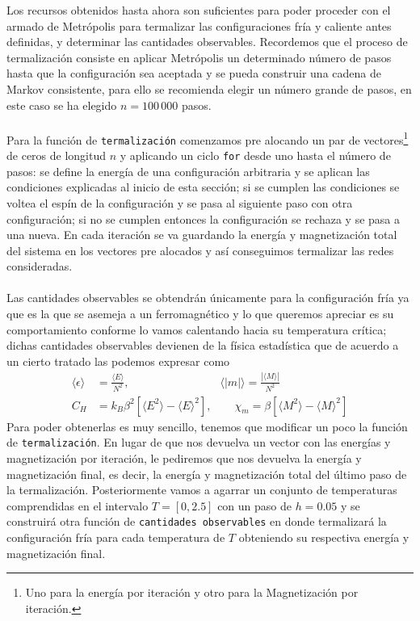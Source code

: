 \documentclass[11pt,a4paper]{article}
\begin{document}
Los recursos obtenidos hasta ahora son suficientes para poder proceder con el armado de Metrópolis para termalizar las configuraciones fría y caliente antes definidas, y determinar las cantidades observables. Recordemos que el proceso de termalización consiste en aplicar Metrópolis un determinado número de pasos hasta que la configuración sea aceptada y se pueda construir una cadena de Markov consistente, para ello se recomienda elegir un número grande de pasos, en este caso se ha elegido $n=100\, 000$ pasos.\\
\\
Para la función de \texttt{termalización} comenzamos pre alocando un par de vectores\footnote{Uno para la energía por iteración y otro para la Magnetización por iteración.} de ceros de longitud $n$ y aplicando un ciclo \texttt{for} desde uno hasta el número de pasos: se define la energía de una configuración arbitraria y se aplican las condiciones explicadas al inicio de esta sección; si se cumplen las condiciones se voltea el espín de la configuración y se pasa al siguiente paso con otra configuración; si no se cumplen entonces la configuración se rechaza y se pasa a una nueva. En cada iteración se va guardando la energía y magnetización total del sistema en los vectores pre alocados y así conseguimos termalizar las redes consideradas.\\
\\
Las cantidades observables se obtendrán únicamente para la configuración fría ya que es la que se asemeja a un ferromagnético y lo que queremos apreciar es su comportamiento conforme lo vamos calentando hacia su temperatura crítica; dichas cantidades observables devienen de la física estadística que de acuerdo a un cierto \cite{stickler} tratado las podemos expresar como
\begin{align}
\langle\epsilon\rangle&=\frac{\langle E\rangle}{N^2},\qquad\qquad\qquad\qquad \langle|m|\rangle=\frac{|\langle M\rangle|}{N^2}\label{eq:EyM}\\
C_H&=k_B\beta^2\left[\langle E^2\rangle-\langle E\rangle^2\right],\qquad \chi_m=\beta\left[\langle M^2\rangle-\langle M\rangle^2\right]\label{eq:CyX}
\end{align}
Para poder obtenerlas es muy sencillo, tenemos que modificar un poco la función de \texttt{termalización}. En lugar de que nos devuelva un vector con las energías y magnetización por iteración, le pediremos que nos devuelva la energía y magnetización final, es decir, la energía y magnetización total del último paso de la termalización. Posteriormente vamos a agarrar un conjunto de temperaturas comprendidas en el intervalo $T=[0,2.5]$ con un paso de $h=0.05$ y se construirá otra función de \texttt{cantidades observables} en donde termalizará la configuración fría para cada temperatura de $T$ obteniendo su respectiva energía y magnetización final. \\
\end{document}
